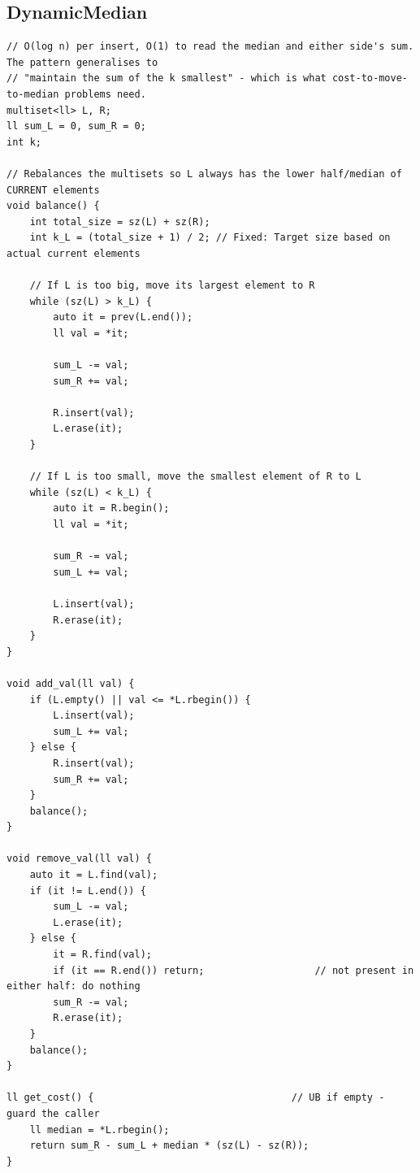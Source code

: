 \documentclass[9pt,a4paper,twocolumn]{extarticle}
\begin{document}
\subsection{DynamicMedian}
\nopagebreak
\begin{lstlisting}
// O(log n) per insert, O(1) to read the median and either side's sum. The pattern generalises to
// "maintain the sum of the k smallest" - which is what cost-to-move-to-median problems need.
multiset<ll> L, R;
ll sum_L = 0, sum_R = 0;
int k;

// Rebalances the multisets so L always has the lower half/median of CURRENT elements
void balance() {
    int total_size = sz(L) + sz(R);
    int k_L = (total_size + 1) / 2; // Fixed: Target size based on actual current elements

    // If L is too big, move its largest element to R
    while (sz(L) > k_L) {
        auto it = prev(L.end());
        ll val = *it;

        sum_L -= val;
        sum_R += val;

        R.insert(val);
        L.erase(it);
    }

    // If L is too small, move the smallest element of R to L
    while (sz(L) < k_L) {
        auto it = R.begin();
        ll val = *it;

        sum_R -= val;
        sum_L += val;

        L.insert(val);
        R.erase(it);
    }
}

void add_val(ll val) {
    if (L.empty() || val <= *L.rbegin()) {
        L.insert(val);
        sum_L += val;
    } else {
        R.insert(val);
        sum_R += val;
    }
    balance();
}

void remove_val(ll val) {
    auto it = L.find(val);
    if (it != L.end()) {
        sum_L -= val;
        L.erase(it);
    } else {
        it = R.find(val);
        if (it == R.end()) return;                   // not present in either half: do nothing
        sum_R -= val;
        R.erase(it);
    }
    balance();
}

ll get_cost() {                                  // UB if empty - guard the caller
    ll median = *L.rbegin();
    return sum_R - sum_L + median * (sz(L) - sz(R));
}
\end{lstlisting}
\end{document}
